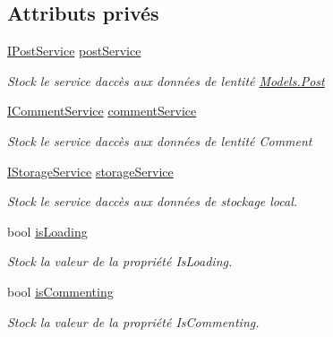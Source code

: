\subsection*{Attributs privés}
\begin{DoxyCompactItemize}
\item 
\hyperlink{interface_boxes_1_1_services_1_1_post_1_1_i_post_service}{I\+Post\+Service} \hyperlink{class_boxes_1_1_view_models_1_1_post_view_model_a429fe7a882ebbfe77a34a61455d57bae}{post\+Service}
\begin{DoxyCompactList}\small\item\em Stock le service d\textquotesingle{}accès aux données de l\textquotesingle{}entité \hyperlink{class_boxes_1_1_models_1_1_post}{Models.\+Post} \end{DoxyCompactList}\item 
\hyperlink{interface_boxes_1_1_services_1_1_comment_1_1_i_comment_service}{I\+Comment\+Service} \hyperlink{class_boxes_1_1_view_models_1_1_post_view_model_acc5fcad092fad7381a4c3af8395a4603}{comment\+Service}
\begin{DoxyCompactList}\small\item\em Stock le service d\textquotesingle{}accès aux données de l\textquotesingle{}entité Comment \end{DoxyCompactList}\item 
\hyperlink{interface_boxes_1_1_services_1_1_storage_1_1_i_storage_service}{I\+Storage\+Service} \hyperlink{class_boxes_1_1_view_models_1_1_post_view_model_a1e927d657f4db7956ceaa5ff9d31f2ff}{storage\+Service}
\begin{DoxyCompactList}\small\item\em Stock le service d\textquotesingle{}accès aux données de stockage local. \end{DoxyCompactList}\item 
bool \hyperlink{class_boxes_1_1_view_models_1_1_post_view_model_a13b8a9424a41561b7fa8eca8fc73a0ad}{is\+Loading}
\begin{DoxyCompactList}\small\item\em Stock la valeur de la propriété {\ttfamily Is\+Loading}. \end{DoxyCompactList}\item 
bool \hyperlink{class_boxes_1_1_view_models_1_1_post_view_model_a06f6200613d692348207b39b079e62d8}{is\+Commenting}
\begin{DoxyCompactList}\small\item\em Stock la valeur de la propriété {\ttfamily Is\+Commenting}. \end{DoxyCompactList}\item 

\end{DoxyCompactItemize}
